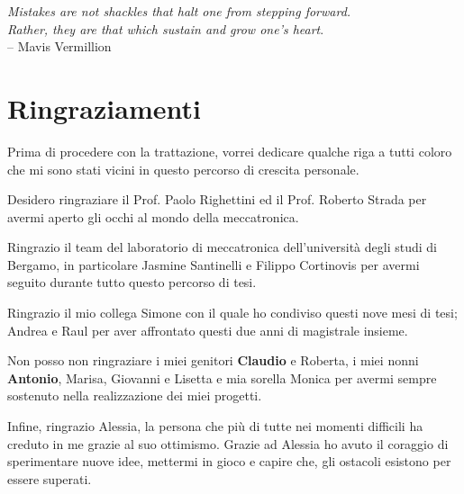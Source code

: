 \begin{flushright}

    \par   %
    \vspace{2\baselineskip}
    \textit{Mistakes are not shackles that halt one from stepping forward. \\Rather, they are that which sustain and grow one’s heart}. \\– Mavis Vermillion


\end{flushright}
\vfill
\section*{Ringraziamenti}
Prima di procedere con la trattazione, vorrei dedicare qualche riga a tutti coloro che mi sono stati vicini in questo percorso di crescita personale.
\par Desidero ringraziare il Prof. Paolo Righettini ed il Prof. Roberto Strada per avermi aperto gli occhi al mondo della meccatronica.
\par Ringrazio il team del laboratorio di meccatronica dell'università degli studi di Bergamo, in particolare Jasmine Santinelli e Filippo Cortinovis per avermi seguito durante tutto questo percorso di tesi.
\par Ringrazio il mio collega Simone con il quale ho condiviso questi nove mesi di tesi; Andrea e Raul per aver affrontato questi due anni di magistrale insieme.
\par Non posso non ringraziare i miei genitori \textbf{Claudio} e Roberta, i miei nonni \textbf{Antonio}, Marisa, Giovanni e Lisetta e mia sorella Monica per avermi sempre sostenuto nella realizzazione dei miei progetti.
\par Infine, ringrazio Alessia, la persona che più di tutte nei momenti difficili ha creduto in me grazie al suo ottimismo. Grazie ad Alessia ho avuto il coraggio di sperimentare nuove idee, mettermi in gioco e capire che, gli ostacoli esistono per essere superati.